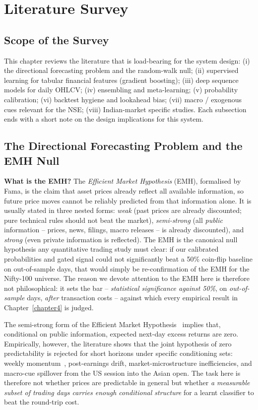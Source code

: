 \chapter{Literature Survey} \label{chapter2}

\section{Scope of the Survey}

This chapter reviews the literature that is load-bearing for the system design: (i) the directional forecasting problem and the random-walk null; (ii) supervised learning for tabular financial features (gradient boosting); (iii) deep sequence models for daily OHLCV; (iv) ensembling and meta-learning; (v) probability calibration; (vi) backtest hygiene and lookahead bias; (vii) macro / exogenous cues relevant for the NSE; (viii) Indian-market specific studies. Each subsection ends with a short note on the design implications for this system.

\section{The Directional Forecasting Problem and the EMH Null}

\textbf{What is the EMH?} The \emph{Efficient Market Hypothesis} (EMH), formalised by Fama, is the claim that asset prices already reflect all available information, so future price moves cannot be reliably predicted from that information alone. It is usually stated in three nested forms: \emph{weak} (past prices are already discounted; pure technical rules should not beat the market), \emph{semi-strong} (all \emph{public} information -- prices, news, filings, macro releases -- is already discounted), and \emph{strong} (even private information is reflected). The EMH is the canonical null hypothesis any quantitative trading study must clear: if our calibrated probabilities and gated signal could not significantly beat a 50\% coin-flip baseline on out-of-sample days, that would simply be re-confirmation of the EMH for the Nifty-100 universe. The reason we devote attention to the EMH here is therefore not philosophical: it sets the bar -- \emph{statistical significance against 50\%}, on \emph{out-of-sample} days, \emph{after} transaction costs -- against which every empirical result in Chapter~\ref{chapter4} is judged.

\medskip

The semi-strong form of the Efficient Market Hypothesis~\cite{fama1970emh} implies that, conditional on public information, expected next-day excess returns are zero. Empirically, however, the literature shows that the joint hypothesis of zero predictability is rejected for short horizons under specific conditioning sets: weekly momentum~\cite{jegadeesh1993momentum}, post-earnings drift, market-microstructure inefficiencies, and macro-cue spillover from the US session into the Asian open. The task here is therefore not whether prices are predictable in general but whether \emph{a measurable subset of trading days carries enough conditional structure} for a learnt classifier to beat the round-trip cost.

